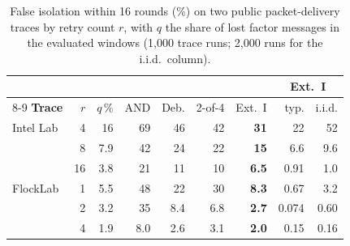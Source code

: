 \documentclass{ieeeaccess}
\begin{document}
\begin{table}[!t]
\caption{False isolation within 16 rounds (\%) on two public packet-delivery traces by retry count $r$, with $q$ the share of lost factor messages in the evaluated windows (1{,}000 trace runs; 2{,}000 runs for the i.i.d.\ column).}
\label{tab:trace}
\centering
\renewcommand{\arraystretch}{1.08}
\footnotesize
\setlength{\tabcolsep}{2.4pt}
\begin{tabular}{lrrrrrrrr}
\toprule
 & & & & & & & \multicolumn{2}{c}{\textbf{Ext.~I}} \\
\cmidrule(lr){8-9}
\textbf{Trace} & $r$ & $q$\,\% & AND & Deb. & 2-of-4 & Ext.~I & typ. & i.i.d. \\
\midrule
Intel Lab & 4 & 16 & 69 & 46 & 42 & \textbf{31} & 22 & 52 \\
 & 8 & 7.9 & 42 & 24 & 22 & \textbf{15} & 6.6 & 9.6 \\
 & 16 & 3.8 & 21 & 11 & 10 & \textbf{6.5} & 0.91 & 1.0 \\
\midrule
FlockLab & 1 & 5.5 & 48 & 22 & 30 & \textbf{8.3} & 0.67 & 3.2 \\
 & 2 & 3.2 & 35 & 8.4 & 6.8 & \textbf{2.7} & 0.074 & 0.60 \\
 & 4 & 1.9 & 8.0 & 2.6 & 3.1 & \textbf{2.0} & 0.15 & 0.16 \\
\bottomrule
\end{tabular}
\end{table}
\end{document}
